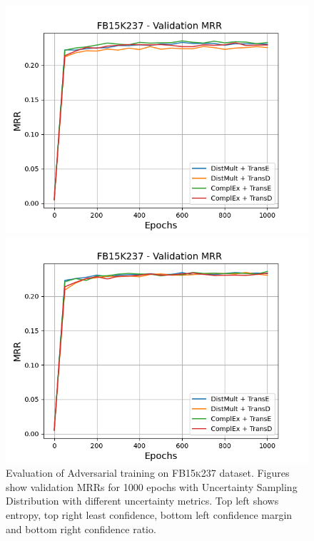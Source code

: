 \begin{figure}
    \begin{minipage}{.5\textwidth}
      \centering
      \includegraphics[width=0.9\linewidth]{figures/results/gan_train/not_pretrained/uncertainty/max_distribution/confidence_margin/fb15k237/uncertainty_fb15k237_mrrs.png}
    \end{minipage}%
    \begin{minipage}{.5\textwidth}
      \centering
      \includegraphics[width=0.9\linewidth]{figures/results/gan_train/not_pretrained/uncertainty/max_distribution/confidence_ratio/fb15k237/uncertainty_fb15k237_mrrs.png}
    \end{minipage}%
    \caption{Evaluation of Adversarial training on \textsc{FB15k237} dataset. 
    Figures show validation MRRs for 1000 epochs with Uncertainty Sampling Distribution with different uncertainty metrics.
    Top left shows entropy, top right least confidence, 
    bottom left confidence margin and bottom right confidence ratio.}
    \label{fig:advtrain_metrics_fb15k237}
\end{figure}
